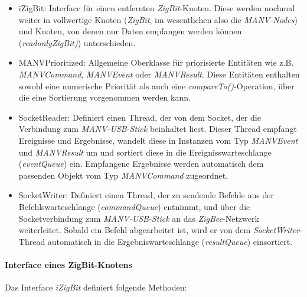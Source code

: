     \begin{itemize}
        \item{iZigBit:} Interface für einen entfernten \emph{ZigBit}-Knoten. Diese werden nochmal weiter
                        in vollwertige Knoten (\emph{ZigBit}, im wesentlichen also die \emph{MANV-Nodes})
                        und Knoten, von denen nur Daten empfangen werden können (\emph{readonlyZigBit)})
                        unterschieden.
        \item{MANVPrioritized:} Allgemeine Oberklasse für priorisierte Entitäten wie z.B. \emph{MANVCommand},
                                \emph{MANVEvent} oder \emph{MANVResult}. Diese Entitäten enthalten 
                                sowohl eine numerische Priorität als auch eine \emph{compareTo()}-Operation,
                                über die eine Sortierung vorgenommen werden kann.
        \item{SocketReader:} Definiert einen Thread, der von dem Socket, der die Verbindung zum \emph{MANV-USB-Stick}
                             beinhaltet liest. Dieser Thread empfangt Ereignisse und Ergebnisse, wandelt diese 
                             in Instanzen vom Typ \emph{MANVEvent} und \emph{MANVResult} um und sortiert diese
                             in die Ereignisswarteschlange (\emph{eventQueue}) ein. Empfangene Ergebnisse werden
                             automatisch dem passenden Objekt vom Typ \emph{MANVCommand} zugeordnet.
        \item{SocketWriter:} Definiert einen Thread, der zu sendende Befehle aus der Befehlswarteschlange
                             (\emph{commandQueue}) entnimmt, und über die Socketverbindung zum \emph{MANV-USB-Stick}
                             an das \emph{ZigBee}-Netzwerk weiterleitet. Sobald ein Befehl abgearbeitet ist,
                             wird er von dem \emph{SocketWriter}-Thread automatisch in die Ergebniswarteschlange 
                             (\emph{resultQueue}) einsortiert.
    \end{itemize}


    \paragraph{Interface eines ZigBit-Knotens}

    Das Interface \emph{iZigBit} definiert folgende Methoden:

